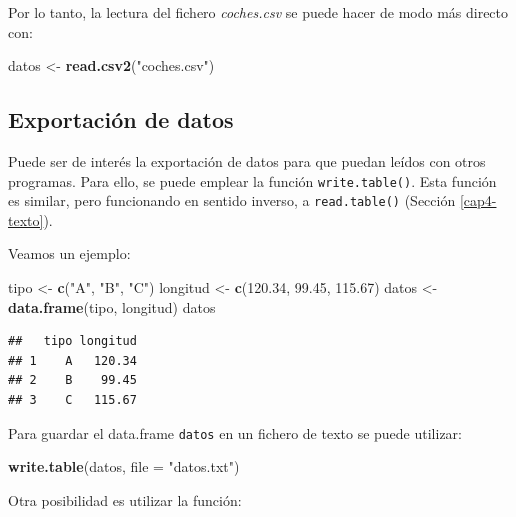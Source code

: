 \documentclass[]{book}
\newenvironment{Shaded}{\begin{snugshade}}{\end{snugshade}}
\newcommand{\DataTypeTok}[1]{\textcolor[rgb]{0.13,0.29,0.53}{#1}}
\newcommand{\FloatTok}[1]{\textcolor[rgb]{0.00,0.00,0.81}{#1}}
\newcommand{\KeywordTok}[1]{\textcolor[rgb]{0.13,0.29,0.53}{\textbf{#1}}}
\newcommand{\NormalTok}[1]{#1}
\newcommand{\StringTok}[1]{\textcolor[rgb]{0.31,0.60,0.02}{#1}}
\begin{document}
Por lo tanto, la lectura del fichero \emph{coches.csv} se puede hacer de modo
más directo con:

\begin{Shaded}
\begin{Highlighting}[]
\NormalTok{datos <-}\StringTok{ }\KeywordTok{read.csv2}\NormalTok{(}\StringTok{"coches.csv"}\NormalTok{)}
\end{Highlighting}
\end{Shaded}

\hypertarget{exportacion-de-datos}{%
\subsection{Exportación de datos}\label{exportacion-de-datos}}

Puede ser de interés la
exportación de datos para que puedan leídos con otros programas. Para
ello, se puede emplear la función \texttt{write.table()}. Esta función es
similar, pero funcionando en sentido inverso, a \texttt{read.table()}
(Sección \ref{cap4-texto}).

Veamos un ejemplo:

\begin{Shaded}
\begin{Highlighting}[]
\NormalTok{tipo <-}\StringTok{ }\KeywordTok{c}\NormalTok{(}\StringTok{"A"}\NormalTok{, }\StringTok{"B"}\NormalTok{, }\StringTok{"C"}\NormalTok{)}
\NormalTok{longitud <-}\StringTok{ }\KeywordTok{c}\NormalTok{(}\FloatTok{120.34}\NormalTok{, }\FloatTok{99.45}\NormalTok{, }\FloatTok{115.67}\NormalTok{)}
\NormalTok{datos <-}\StringTok{ }\KeywordTok{data.frame}\NormalTok{(tipo, longitud)}
\NormalTok{datos}
\end{Highlighting}
\end{Shaded}

\begin{verbatim}
##   tipo longitud
## 1    A   120.34
## 2    B    99.45
## 3    C   115.67
\end{verbatim}

Para guardar el data.frame \texttt{datos} en un fichero de texto se
puede utilizar:

\begin{Shaded}
\begin{Highlighting}[]
\KeywordTok{write.table}\NormalTok{(datos, }\DataTypeTok{file =} \StringTok{"datos.txt"}\NormalTok{)}
\end{Highlighting}
\end{Shaded}

Otra posibilidad es utilizar la función:
\end{document}
